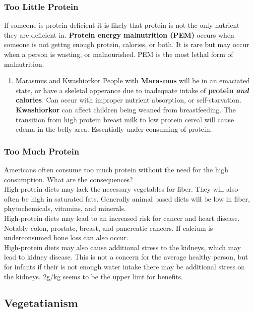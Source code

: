 \documentclass[letterpaper, 11pt]{article}
\begin{document}
\subsubsection{Too Little Protein}
\label{sec:orga538267}
If someone is protein deficient it is likely that protein is not the only nutrient they are deficient in. \textbf{Protein energy malnutrition (PEM)} occurs when someone is not gettng enough protein, calories, or both. It is rare but may occur when a person is wasting, or malnourished. PEM is the most lethal form of malnutrition.\\
\begin{enumerate}
\item Marasmus and Kwashiorkor
\label{sec:orgdff29d2}
People with \textbf{Marasmus} will be in an emaciated state, or have a skeletal apperance due to inadequate intake of \textbf{protein \emph{and} calories}. Can occur with improper nutrient absorption, or self-starvation.\\
\textbf{Kwashiorkor} can affect children being weaned from breastfeeding. The transition from high protein breast milk to low protein cereal will cause edema in the belly area. Essentially under consuming of protein.\\
\end{enumerate}
\subsubsection{Too Much Protein}
\label{sec:org9faa14c}
Americans often consume too much protein without the need for the high consumption. What are the consequences?\\
High-protein diets may lack the necessary vegetables for fiber. They will also often be high in saturated fats. Generally animal based diets will be low in fiber, phytochemicals, vitamins, and minerals.\\
High-protein diets may lead to an increased risk for cancer and heart disease. Notably colon, prostate, breast, and pancreatic cancers. If calcium is underconsumed bone loss can also occur.\\
High-protein diets may also cause additional stress to the kidneys, which may lead to kidney disease. This is not a concern for the average healthy person, but for infants if their is not enough water intake there may be additional stress on the kidneys. 2g/kg seems to be the upper limt for benefits.\\
\subsection{Vegetatianism}
\label{sec:orgcc3146f}
\end{document}
